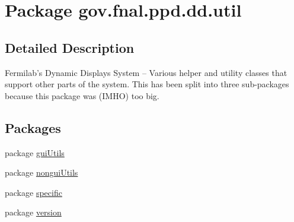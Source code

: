 \hypertarget{namespacegov_1_1fnal_1_1ppd_1_1dd_1_1util}{\section{Package gov.\-fnal.\-ppd.\-dd.\-util}
\label{namespacegov_1_1fnal_1_1ppd_1_1dd_1_1util}
}


\subsection{Detailed Description}
Fermilab's Dynamic Displays System -- Various helper and utility classes that support other parts of the system. This has been split into three sub-\/packages because this package was (I\-M\-H\-O) too big. \subsection*{Packages}
\begin{DoxyCompactItemize}
\item 
package \hyperlink{namespacegov_1_1fnal_1_1ppd_1_1dd_1_1util_1_1guiUtils}{gui\-Utils}
\item 
package \hyperlink{namespacegov_1_1fnal_1_1ppd_1_1dd_1_1util_1_1nonguiUtils}{nongui\-Utils}
\item 
package \hyperlink{namespacegov_1_1fnal_1_1ppd_1_1dd_1_1util_1_1specific}{specific}
\item 
package \hyperlink{namespacegov_1_1fnal_1_1ppd_1_1dd_1_1util_1_1version}{version}
\end{DoxyCompactItemize}
